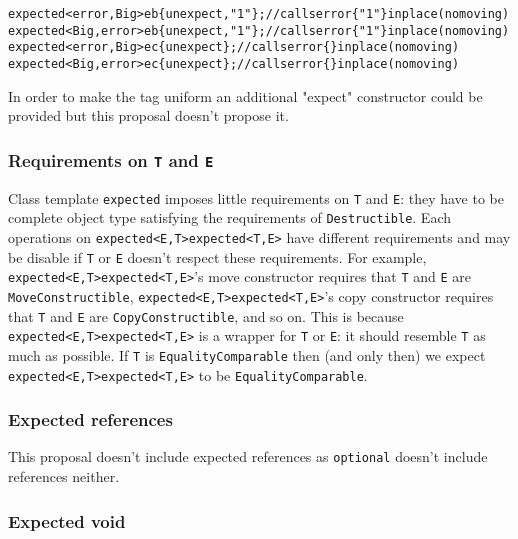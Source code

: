 \documentclass[a4paper,10pt]{article}
\newcommand{\cpp}[1]{\lstinline{#1}}
\newcommand{\suppress}[1]{\colorbox{suppress_color}{#1}}
\newcommand{\update}[1]{\colorbox{update_color}{#1}}
\begin{document}
\begin{alltt}
\suppress{expected<error, Big> eb\{unexpect, "1"\}; // calls error\{"1"\} in place (no moving)}
\update{expected<Big, error> eb\{unexpect, "1"\}; // calls error\{"1"\} in place (no moving)}
\suppress{expected<error, Big> ec\{unexpect\};      // calls error\{\} in place (no moving)}
\update{expected<Big, error> ec\{unexpect\};      // calls error\{\} in place (no moving)}
\end{alltt}

In order to make the tag uniform an additional "expect" constructor could be provided but this proposal doesn't propose it.

\subsubsection{Requirements on \cpp{T} and \cpp{E}}

Class template \cpp{expected} imposes little requirements on \cpp{T} and \cpp{E}: they have to be  complete object type satisfying the requirements of \cpp{Destructible}. Each operations on \suppress{\cpp{expected<E,T>}}\update{\cpp{expected<T,E>}} have different requirements and may be disable if \cpp{T} or \cpp{E} doesn't respect these requirements. For example, \suppress{\cpp{expected<E,T>}}\update{\cpp{expected<T,E>}}'s move constructor requires that \cpp{T} and \cpp{E} are \cpp{MoveConstructible}, \suppress{\cpp{expected<E,T>}}\update{\cpp{expected<T,E>}}'s copy constructor requires that \cpp{T} and \cpp{E} are \cpp{CopyConstructible}, and so on. This is because \suppress{\cpp{expected<E,T>}}\update{\cpp{expected<T,E>}} is a wrapper for \cpp{T} or \cpp{E}: it should resemble \cpp{T} as much as possible. If \cpp{T} is \cpp{EqualityComparable} then (and only then) we expect \suppress{\cpp{expected<E,T>}}\update{\cpp{expected<T,E>}} to be \cpp{EqualityComparable}. 

\subsubsection{Expected references}

This proposal doesn't include expected references as \cpp{optional}\cite{OptionalRev5} doesn't include references neither.

\subsubsection{Expected void}
\end{document}
